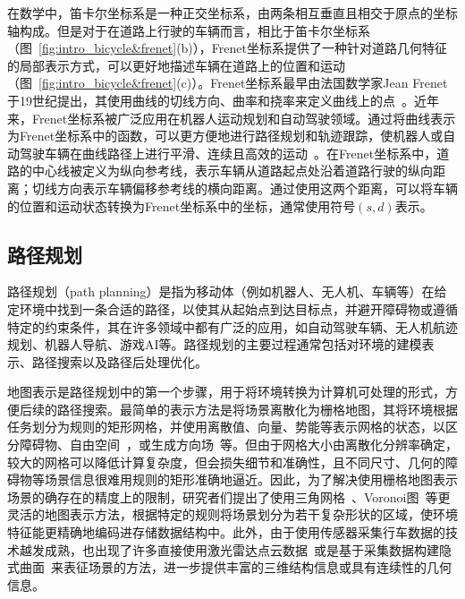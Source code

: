 在数学中，笛卡尔坐标系是一种正交坐标系，由两条相互垂直且相交于原点的坐标轴构成。但是对于在道路上行驶的车辆而言，相比于笛卡尔坐标系（图~\ref{fig:intro_bicycle&frenet}(b)），Frenet坐标系提供了一种针对道路几何特征的局部表示方式，可以更好地描述车辆在道路上的位置和运动（图~\ref{fig:intro_bicycle&frenet}(c)）。Frenet坐标系最早由法国数学家Jean Frenet于19世纪提出，其使用曲线的切线方向、曲率和挠率来定义曲线上的点~\cite{serret1851quelques, frenet1852courbes}。近年来，Frenet坐标系被广泛应用在机器人运动规划和自动驾驶领域。通过将曲线表示为Frenet坐标系中的函数，可以更方便地进行路径规划和轨迹跟踪，使机器人或自动驾驶车辆在曲线路径上进行平滑、连续且高效的运动~\cite{werling2010optimal, yoshihara2017autonomous, zhu2020trajectory}。在Frenet坐标系中，道路的中心线被定义为纵向参考线，表示车辆从道路起点处沿着道路行驶的纵向距离；切线方向表示车辆偏移参考线的横向距离。通过使用这两个距离，可以将车辆的位置和运动状态转换为Frenet坐标系中的坐标，通常使用符号$(s, d)$表示。


\subsection{路径规划}

路径规划（path planning）是指为移动体（例如机器人、无人机、车辆等）在给定环境中找到一条合适的路径，以使其从起始点到达目标点，并避开障碍物或遵循特定的约束条件，其在许多领域中都有广泛的应用，如自动驾驶车辆、无人机航迹规划、机器人导航、游戏AI等。路径规划的主要过程通常包括对环境的建模表示、路径搜索以及路径后处理优化。

地图表示是路径规划中的第一个步骤，用于将环境转换为计算机可处理的形式，方便后续的路径搜索。最简单的表示方法是将场景离散化为栅格地图，其将环境根据任务划分为规则的矩形网格，并使用离散值、向量、势能等表示网格的状态，以区分障碍物、自由空间~\cite{lee2011smooth, lee2013hierarchical}，或生成方向场~\cite{sakuma2005psychological, patil2010directing}等。但由于网格大小由离散化分辨率确定，较大的网格可以降低计算复杂度，但会损失细节和准确性，且不同尺寸、几何的障碍物等场景信息很难用规则的矩形准确地逼近。因此，为了解决使用栅格地图表示场景的确存在的精度上的限制，研究者们提出了使用三角网格~\cite{lamarche2004crowd, kallmann2005path}、Voronoi图~\cite{choset1996sensor, sud2007surface, sud2008real}等更灵活的地图表示方法，根据特定的规则将场景划分为若干复杂形状的区域，使环境特征能更精确地编码进存储数据结构中。此外，由于使用传感器采集行车数据的技术越发成熟，也出现了许多直接使用激光雷达点云数据~\cite{chen2015safe}或是基于采集数据构建隐式曲面~\cite{breitenmoser2012surface}来表征场景的方法，进一步提供丰富的三维结构信息或具有连续性的几何信息。

